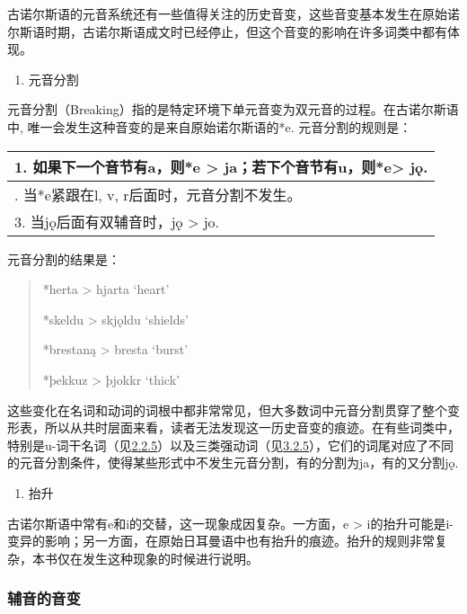 古诺尔斯语的元音系统还有一些值得关注的历史音变，这些音变基本发生在原始诺尔斯语时期，古诺尔斯语成文时已经停止，但这个音变的影响在许多词类中都有体现。

\begin{enumerate}
\def\labelenumi{\Alph{enumi}.}
\setcounter{enumi}{3}
\item
  元音分割
\end{enumerate}

元音分割（Breaking）指的是特定环境下单元音变为双元音的过程。在古诺尔斯语中,
唯一会发生这种音变的是来自原始诺尔斯语的*e. 元音分割的规则是：

\begin{longtable}{l}
\toprule
1. 如果下一个音节有a，则*e \textgreater{} ja；若下个音节有u，则*e\textgreater{} jǫ. \\
\midrule
\endhead
\bottomrule
\endfoot
2. 当*e紧跟在l, v, r后面时，元音分割不发生。 \\
3. 当jǫ后面有双辅音时，jǫ \textgreater{} jo. \\
\end{longtable}

元音分割的结果是：

\begin{quote}
*herta \textgreater{} hjarta `heart'

*skeldu \textgreater{} skjǫldu `shields'

*brestaną \textgreater{} bresta `burst'

*þekkuz \textgreater{} þjokkr `thick'
\end{quote}

这些变化在名词和动词的词根中都非常常见，但大多数词中元音分割贯穿了整个变形表，所以从共时层面来看，读者无法发现这一历史音变的痕迹。在有些词类中，特别是u-词干名词（见\hyperref[u-ux8bcdux5e72]{2.2.5}）以及三类强动词（见\hyperref[ux7b2cux4e09ux5f3aux53d8ux4f4dux6cd5]{3.2.5}），它们的词尾对应了不同的元音分割条件，使得某些形式中不发生元音分割，有的分割为ja，有的又分割jǫ.

\begin{enumerate}
\def\labelenumi{\Alph{enumi}.}
\setcounter{enumi}{4}
\item
  抬升
\end{enumerate}

古诺尔斯语中常有e和i的交替，这一现象成因复杂。一方面，e \textgreater{}
i的抬升可能是i-变异的影响；另一方面，在原始日耳曼语中也有抬升的痕迹。抬升的规则非常复杂，本书仅在发生这种现象的时候进行说明。

\subsubsection{辅音的音变}\label{ux8f85ux97f3ux7684ux97f3ux53d8}


